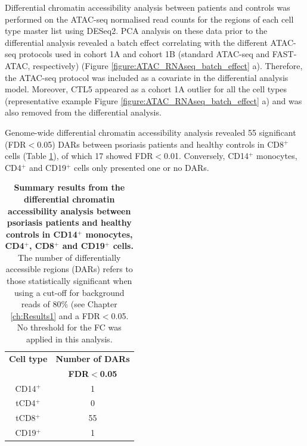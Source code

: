 Differential chromatin accessibility analysis between patients and controls was performed on the ATAC-seq normalised read counts for the regions of each cell type master list using DESeq2. PCA analysis on these data prior to the differential analysis revealed a batch effect correlating with the different ATAC-seq protocols used in cohort 1A and cohort 1B (standard ATAC-seq and FAST-ATAC, respectively) (Figure \ref{figure:ATAC_RNAseq_batch_effect} a). Therefore, the ATAC-seq protocol was included as a covariate in the differential analysis model. Moreover, CTL5 appeared as a cohort 1A outlier for all the cell types (representative example Figure \ref{figure:ATAC_RNAseq_batch_effect} a) and was also removed from the differential analysis.

Genome-wide differential chromatin accessibility analysis revealed 55 significant (FDR$<$0.05) DARs between psoriasis patients and healthy controls in CD8$^+$ cells (Table \ref{tab:ATAC_PS_CTL_differential_analysis_results}), of which 17 showed FDR$<$0.01. Conversely, CD14$^+$ monocytes, CD4$^+$ and CD19$^+$ cells only presented one or no DARs. 


\begin{table}[htbp]
\centering
\begin{tabular}{@{} c c}
\toprule
\textbf{Cell type}   & \textbf{Number of DARs} \\
                     & \textbf{FDR$<$0.05}     \\
\midrule
\midrule
CD14$^+$             & 1 \\                 
tCD4$^+$              & 0 \\
tCD8$^+$              & 55 \\
CD19$^+$             & 1 \\
\bottomrule 
\end{tabular}
\medskip %
\caption[Summary results from the differential chromatin accessibility analysis between psoriasis patients and healthy controls in CD14$^+$ monocytes, CD4$^+$, CD8$^+$ and CD19$^+$ cells.]{\textbf{Summary results from the differential chromatin accessibility analysis between psoriasis patients and healthy controls in CD14$^+$ monocytes, CD4$^+$, CD8$^+$ and CD19$^+$ cells.} The number of differentially accessible regions (DARs) refers to those statistically significant when using a cut-off for background reads of 80\% (see Chapter \ref{ch:Results1} and a FDR$<$0.05. No threshold for the FC was applied in this analysis.}
\label{tab:ATAC_PS_CTL_differential_analysis_results}
\end{table}
\bigskip %


